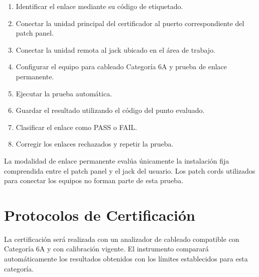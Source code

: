 \begin{enumerate}
    \item Identificar el enlace mediante su código de etiquetado.
    \item Conectar la unidad principal del certificador al puerto correspondiente del patch panel.
    \item Conectar la unidad remota al jack ubicado en el área de trabajo.
    \item Configurar el equipo para cableado Categoría 6A y prueba de enlace permanente.
    \item Ejecutar la prueba automática.
    \item Guardar el resultado utilizando el código del punto evaluado.
    \item Clasificar el enlace como PASS o FAIL.
    \item Corregir los enlaces rechazados y repetir la prueba.
\end{enumerate}

La modalidad de enlace permanente evalúa únicamente la instalación fija comprendida entre el patch panel y el jack del usuario. Los patch cords utilizados para conectar los equipos no forman parte de esta prueba.

\section{Protocolos de Certificación}

La certificación será realizada con un analizador de cableado compatible con Categoría 6A y con calibración vigente. El instrumento comparará automáticamente los resultados obtenidos con los límites establecidos para esta categoría.

